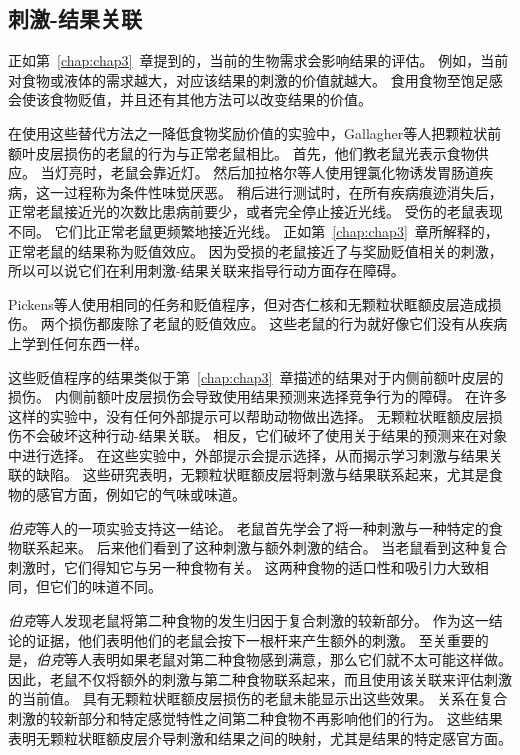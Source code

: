 \subsection{刺激-结果关联}

正如第~\ref{chap:chap3}~章提到的，当前的生物需求会影响结果的评估。
例如，当前对食物或液体的需求越大，对应该结果的刺激的价值就越大。
食用食物至饱足感会使该食物贬值，并且还有其他方法可以改变结果的价值。\par


在使用这些替代方法之一降低食物奖励价值的实验中，Gallagher等人\cite{gallagher1999orbitofrontal}把颗粒状前额叶皮层损伤的老鼠的行为与正常老鼠相比。
首先，他们教老鼠光表示食物供应。
当灯亮时，老鼠会靠近灯。
然后加拉格尔等人使用锂氯化物诱发胃肠道疾病，这一过程称为条件性味觉厌恶。
稍后进行测试时，在所有疾病痕迹消失后，正常老鼠接近光的次数比患病前要少，或者完全停止接近光线。
受伤的老鼠表现不同。
它们比正常老鼠更频繁地接近光线。
正如第~\ref{chap:chap3}~章所解释的，正常老鼠的结果称为贬值效应。
因为受损的老鼠接近了与奖励贬值相关的刺激，所以可以说它们在利用刺激-结果关联来指导行动方面存在障碍。\par


Pickens等人\cite{pickens2005orbitofrontal,pickens2003different}使用相同的任务和贬值程序，但对杏仁核和无颗粒状眶额皮层造成损伤。
两个损伤都废除了老鼠的贬值效应。
这些老鼠的行为就好像它们没有从疾病上学到任何东西一样。\par


这些贬值程序的结果类似于第~\ref{chap:chap3}~章描述的结果对于内侧前额叶皮层的损伤。
内侧前额叶皮层损伤会导致使用结果预测来选择竞争行为的障碍。
在许多这样的实验中，没有任何外部提示可以帮助动物做出选择。
无颗粒状眶额皮层损伤不会破坏这种行动-结果关联\cite{ostlund2007orbitofrontal}。
相反，它们破坏了使用关于结果的预测来在对象中进行选择。
在这些实验中，外部提示会提示选择，从而揭示学习刺激与结果关联的缺陷。
这些研究表明，无颗粒状眶额皮层将刺激与结果联系起来，尤其是食物的感官方面，例如它的气味或味道。\par


\textit{伯克}等人的一项实验支持这一结论\cite{burke2008role}。
老鼠首先学会了将一种刺激与一种特定的食物联系起来。
后来他们看到了这种刺激与额外刺激的结合。
当老鼠看到这种复合刺激时，它们得知它与另一种食物有关。
这两种食物的适口性和吸引力大致相同，但它们的味道不同。\par


\textit{伯克}等人发现老鼠将第二种食物的发生归因于复合刺激的较新部分。
作为这一结论的证据，他们表明他们的老鼠会按下一根杆来产生额外的刺激。
至关重要的是，\textit{伯克}等人表明如果老鼠对第二种食物感到满意，那么它们就不太可能这样做。
因此，老鼠不仅将额外的刺激与第二种食物联系起来，而且使用该关联来评估刺激的当前值。
具有无颗粒状眶额皮层损伤的老鼠未能显示出这些效果。
关系在复合刺激的较新部分和特定感觉特性之间第二种食物不再影响他们的行为。
这些结果表明无颗粒状眶额皮层介导刺激和结果之间的映射，尤其是结果的特定感官方面。\par


